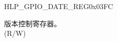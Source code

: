 \begin{register}{H}{LP\_GPIO\_DATE\_REG}{0x03FC}\label{regdesc:LPGPIODATEREG}
%
%
\regnewline%
\begin{regdesc}\begin{reglist}
\label{fielddesc:LPGPIODATE}\item [LP\_GPIO\_DATE] 版本控制寄存器。\\ (R/W)
\end{reglist}\end{regdesc}
\end{register}


